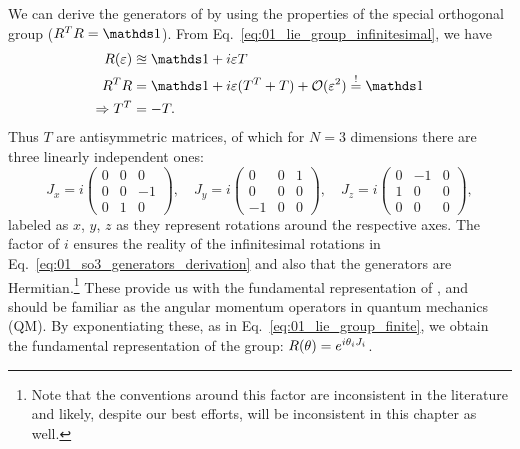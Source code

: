We can derive the generators of \SO[3] by using the properties of the special orthogonal group ($R^TR=\identity$).
From Eq.~\ref{eq:01_lie_group_infinitesimal}, we have
\begin{equation}
	\begin{split}
	\label{eq:01_so3_generators_derivation}
	R(\varepsilon) &\approxeq \identity + i \varepsilon T \\
	R^TR &= \identity + i \varepsilon (T^T + T) + \mathcal O(\varepsilon^2) \mustequal \identity \\
	\Rightarrow T^T &= -T.
\end{split}
\end{equation}
Thus $T$ are antisymmetric matrices, of which for $N = 3$ dimensions there are three linearly independent ones:
\begin{equation}
	\label{eq:01_so3_generators}
	J_x = i\begin{pmatrix}
		0 & 0 & 0 \\
		0 & 0 & -1 \\
		0 & 1 & 0
	\end{pmatrix}, \quad
	J_y = i\begin{pmatrix}
		0 & 0 & 1 \\
		0 & 0 & 0 \\
		-1 & 0 & 0
	\end{pmatrix}, \quad
	J_z = i\begin{pmatrix}
		0 & -1 & 0 \\
		1 & 0 & 0 \\
		0 & 0 & 0
	\end{pmatrix},
\end{equation}
labeled as $x$, $y$, $z$ as they represent rotations around the respective axes.
The factor of $i$ ensures the reality of the infinitesimal rotations in Eq.~\ref{eq:01_so3_generators_derivation} and also that the generators are Hermitian.\footnote{Note that the conventions around this factor are inconsistent in the literature and likely, despite our best efforts, will be inconsistent in this chapter as well.}
These provide us with the fundamental representation of \so[3], and should be familiar as the angular momentum operators in quantum mechanics (QM).
By exponentiating these, as in Eq.~\ref{eq:01_lie_group_finite}, we obtain the fundamental representation of the \SO[3] group: $R(\mathbf{\theta}) = e^{i\theta_i J_i}$.

